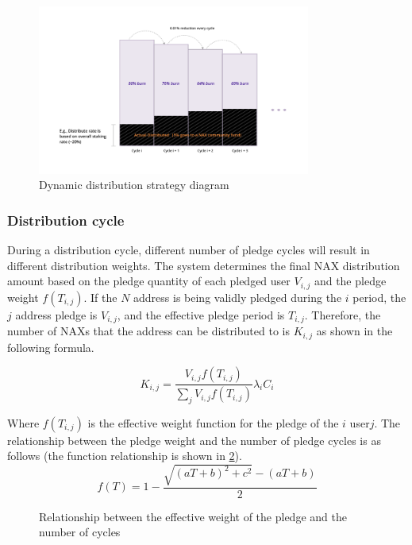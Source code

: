\begin{figure}[h]
  \centering
  \includegraphics[width=0.8\textwidth]{../common/dynamic_dist.pdf}
  \caption{Dynamic distribution strategy diagram\label{fig:dynamic_dist}}
\end{figure}

\subsubsection{Distribution cycle}
During a distribution cycle, different number of pledge cycles will result in different distribution weights. The system determines the final NAX distribution amount based on the pledge quantity of each pledged user $V_{i, j}$ and the pledge weight \(f(T_{i, j})\). If the $N$ address is being validly pledged during the $i$ period, the $j$ address pledge is $V_{i,j}$, and the effective pledge period is $T_{i,j}$. Therefore, the number of NAXs that the address can be distributed to is $K_{i,j}$ as shown in the following formula.

\begin{equation}
  K_{i,j} = \frac{V_{i,j} f(T_{i,j})}{\sum_j V_{i,j} f(T_{i,j})} \lambda_i C_i
\end{equation}

Where \(f(T_{i,j})\) is the effective weight function for the pledge of the \(i\) user\(j\). The relationship between the pledge weight and the number of pledge cycles is as follows (the function relationship is shown in \ref{weight}).
\begin{equation}
  f(T) = 1 - \frac{\sqrt{(aT+b)^2+c^2}-(aT+b)}{2}
\end{equation}

\begin{figure}[h]
\centering
\caption{Relationship between the effective weight of the pledge and the number of cycles}\label{weight}
\end{figure}

